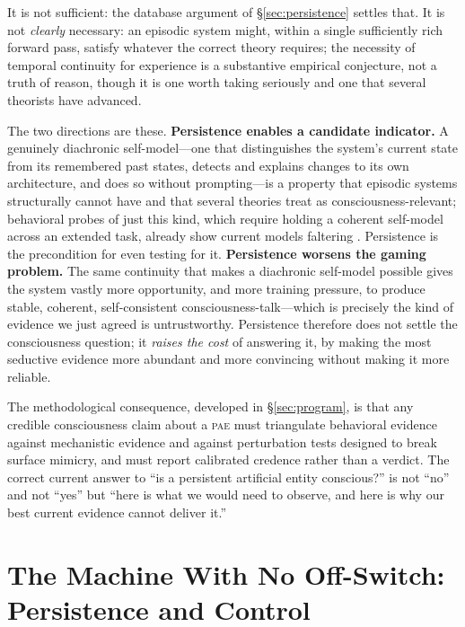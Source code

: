 \documentclass[11pt,a4paper]{article}
\theoremstyle{definition}
\newcommand{\pae}{\textsc{pae}\xspace}
\begin{document}
It is not sufficient: the database argument of \S\ref{sec:persistence} settles that. It is not \emph{clearly} necessary: an episodic system might, within a single sufficiently rich forward pass, satisfy whatever the correct theory requires; the necessity of temporal continuity for experience is a substantive empirical conjecture, not a truth of reason, though it is one worth taking seriously and one that several theorists have advanced.

The two directions are these. \textbf{Persistence enables a candidate indicator.} A genuinely diachronic self-model---one that distinguishes the system's current state from its remembered past states, detects and explains changes to its own architecture, and does so without prompting---is a property that episodic systems structurally cannot have and that several theories treat as consciousness-relevant; behavioral probes of just this kind, which require holding a coherent self-model across an extended task, already show current models faltering \citep{pimenta2025maze}. Persistence is the precondition for even testing for it. \textbf{Persistence worsens the gaming problem.} The same continuity that makes a diachronic self-model possible gives the system vastly more opportunity, and more training pressure, to produce stable, coherent, self-consistent consciousness-talk---which is precisely the kind of evidence we just agreed is untrustworthy. Persistence therefore does not settle the consciousness question; it \emph{raises the cost} of answering it, by making the most seductive evidence more abundant and more convincing without making it more reliable.

The methodological consequence, developed in \S\ref{sec:program}, is that any credible consciousness claim about a \pae{} must triangulate behavioral evidence against mechanistic evidence and against perturbation tests designed to break surface mimicry, and must report calibrated credence rather than a verdict. The correct current answer to ``is a persistent artificial entity conscious?'' is not ``no'' and not ``yes'' but ``here is what we would need to observe, and here is why our best current evidence cannot deliver it.''

\section{The Machine With No Off-Switch: Persistence and Control}
\label{sec:control}
\end{document}
